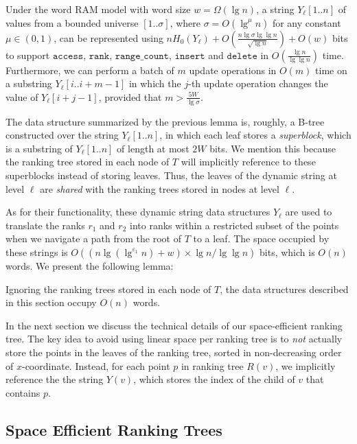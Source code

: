 \documentclass{llncs}
\def\idtt#1{\ensuremath{\mathtt{#1}}}
\def\rankop{\idtt{rank}}
\def\accessop{\idtt{access}}
\def\insertop{\idtt{insert}}
\def\deleteop{\idtt{delete}}
\def\rangecount{\idtt{range\_count}}
\begin{document}
\begin{lemma}[\cite{HM11}]
\label{lem:smallalphabet}
Under the word RAM model with word size $w = \Omega(\lg n)$, a string
$Y_\ell[1..n]$ of values from a bounded universe $[1..\sigma]$, where
$\sigma = O({\lg^{\mu} n})$ for any constant $\mu \in (0,1)$, can be
represented using $nH_0(Y_\ell) + O(\frac{n\lg\sigma\lg\lg
  n}{\sqrt{\lg n}}) + O(w)$ bits to support $\accessop$, $\rankop$,
$\rangecount$, $\insertop$ and $\deleteop$ in $O(\frac{\lg n}{\lg\lg
  n})$ time.  Furthermore, we can perform a batch of $m$ update
operations in $O(m)$ time on a substring $Y_\ell[i..i+m-1]$ in which
the $j$-th update operation changes the value of $Y_\ell[i+j - 1]$,
provided that $m > \frac{5W}{\lg \sigma}$.
\end{lemma}


The data structure summarized by the previous lemma is, roughly, a
B-tree constructed over the string $Y_\ell[1..n]$, in which each leaf
stores a \emph{superblock}, which is a substring of $Y_\ell[1..n]$ of
length at most $2W$ bits.  We mention this because the ranking tree
stored in each node of $T$ will implicitly reference to these
superblocks instead of storing leaves.  Thus, the leaves of the
dynamic string at level $\ell$ are \emph{shared} with the ranking
trees stored in nodes at level $\ell$.

As for their functionality, these dynamic string data structures
$Y_\ell$ are used to translate the ranks $r_1$ and $r_2$ into ranks
within a restricted subset of the points when we navigate a path from
the root of $T$ to a leaf.  The space occupied by these strings is
$O((n \lg (\lg^{\varepsilon_1} n) +w) \times \lg n / \lg \lg n)$ bits,
which is $O(n)$ words.  We present the following lemma:

\begin{lemma}
\label{lem:space-1}
Ignoring the ranking trees stored in each node of $T$, the data
structures described in this section occupy $O(n)$ words.
\end{lemma}

In the next section we discuss the technical details of our
space-efficient ranking tree.  The key idea to avoid using linear
space per ranking tree is to \emph{not} actually store the points in
the leaves of the ranking tree, sorted in non-decreasing order of
$x$-coordinate.  Instead, for each point $p$ in ranking tree $R(v)$,
we implicitly reference the the string $Y(v)$, which stores the index
of the child of $v$ that contains $p$.

\subsection{Space Efficient Ranking Trees\label{sec:serank}}
\end{document}
